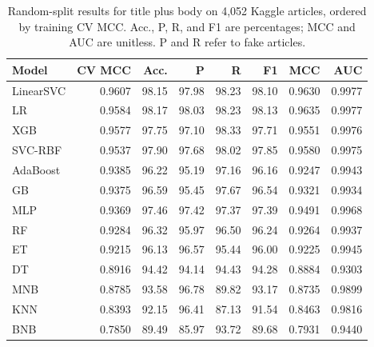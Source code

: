 \begin{table}[t]
\caption{Random-split results for title plus body on 4,052 Kaggle articles, ordered by training CV MCC. Acc., P, R, and F1 are percentages; MCC and AUC are unitless. P and R refer to fake articles.}
\label{tab:primary}\centering\footnotesize
\setlength{\tabcolsep}{3pt}
\begin{tabular}{lrrrrrrr}\toprule
Model & CV MCC & Acc. & P & R & F1 & MCC & AUC\\\midrule
LinearSVC & 0.9607 & 98.15 & 97.98 & 98.23 & 98.10 & 0.9630 & 0.9977\\
LR & 0.9584 & 98.17 & 98.03 & 98.23 & 98.13 & 0.9635 & 0.9977\\
XGB & 0.9577 & 97.75 & 97.10 & 98.33 & 97.71 & 0.9551 & 0.9976\\
SVC-RBF & 0.9537 & 97.90 & 97.68 & 98.02 & 97.85 & 0.9580 & 0.9975\\
AdaBoost & 0.9385 & 96.22 & 95.19 & 97.16 & 96.16 & 0.9247 & 0.9943\\
GB & 0.9375 & 96.59 & 95.45 & 97.67 & 96.54 & 0.9321 & 0.9934\\
MLP & 0.9369 & 97.46 & 97.42 & 97.37 & 97.39 & 0.9491 & 0.9968\\
RF & 0.9284 & 96.32 & 95.97 & 96.50 & 96.24 & 0.9264 & 0.9937\\
ET & 0.9215 & 96.13 & 96.57 & 95.44 & 96.00 & 0.9225 & 0.9945\\
DT & 0.8916 & 94.42 & 94.14 & 94.43 & 94.28 & 0.8884 & 0.9303\\
MNB & 0.8785 & 93.58 & 96.78 & 89.82 & 93.17 & 0.8735 & 0.9899\\
KNN & 0.8393 & 92.15 & 96.41 & 87.13 & 91.54 & 0.8463 & 0.9816\\
BNB & 0.7850 & 89.49 & 85.97 & 93.72 & 89.68 & 0.7931 & 0.9440\\
\bottomrule\end{tabular}\end{table}